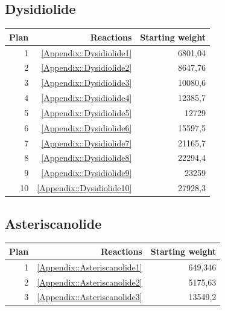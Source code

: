 \documentclass[a4paper,10pt,titlepage]{paper}
\begin{document}
\subsection{Dysidiolide}
\begin{table}[H]
\centering
\begin{tabular}{|r|r|r|}
\hline
Plan & Reactions & Starting weight \\ \hline
1 & \ref{Appendix::Dysidiolide1} & 6801,04 \\\hline
2 & \ref{Appendix::Dysidiolide2} & 8647,76 \\\hline
3 & \ref{Appendix::Dysidiolide3} & 10080,6 \\\hline
4 & \ref{Appendix::Dysidiolide4} & 12385,7 \\\hline
5 & \ref{Appendix::Dysidiolide5} & 12729 \\\hline
6 & \ref{Appendix::Dysidiolide6} & 15597,5 \\\hline
7 & \ref{Appendix::Dysidiolide7} & 21165,7 \\\hline
8 & \ref{Appendix::Dysidiolide8} & 22294,4 \\\hline
9 & \ref{Appendix::Dysidiolide9} & 23259 \\\hline
10 & \ref{Appendix::Dysidiolide10} & 27928,3 \\\hline
\end{tabular}
\end{table}

\subsection{Asteriscanolide}
\begin{table}[H]
\centering
\begin{tabular}{|r|r|r|}
\hline
Plan & Reactions & Starting weight \\ \hline
1 & \ref{Appendix::Asteriscanolide1} & 649,346 \\\hline
2 & \ref{Appendix::Asteriscanolide2} & 5175,63 \\\hline
3 & \ref{Appendix::Asteriscanolide3} & 13549,2 \\\hline
\end{tabular}
\end{table}
\end{document}
